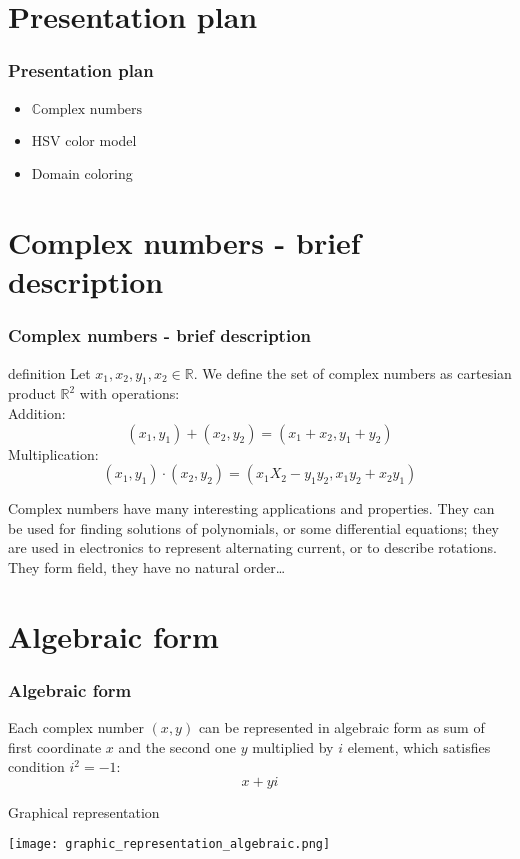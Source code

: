 \documentclass[11pt]{beamer}
\author{Alan Andrzejak, Aleksy Dziarmaga, Michał Kloc}
\title{}
\date{}
\begin{document}
\begin{frame}
\titlepage
\end{frame}
\section{Presentation plan}
\begin{frame}
\frametitle{Presentation plan}\pause
\begin{itemize}
\item $\mathbb{C}\mbox{omplex numbers}$
\pause
\item HSV color model
\pause
\item Domain coloring
\end{itemize}
\end{frame}
\section{Complex numbers - brief description}
\begin{frame}
\frametitle{Complex numbers - brief description}
\begin{block}{definition}\pause
Let $x_1, x_2, y_1, x_2\in\mathbb{R}$. We define the set of complex numbers as cartesian product $\mathbb{R}^2$ with operations:
\pause
\\
Addition:
$$(x_1,y_1)+(x_2,y_2)=(x_1+x_2,y_1+y_2)$$\pause
Multiplication:
$$(x_1,y_1)\cdot(x_2,y_2)=(x_1X_2-y_1y_2,x_1y_2+x_2y_1)$$
\end{block}
\pause
\begin{block}{}
Complex numbers have many interesting applications and properties. They can be used for finding solutions of polynomials, or some differential equations; they are used in electronics to represent alternating current, or to describe rotations. They form field, they have no natural order\dots
\end{block}
\end{frame}
\section{Algebraic form}
\begin{frame}
\frametitle{Algebraic form}
\begin{block}{}
Each complex number $(x,y)$ can be represented in algebraic form as sum of first coordinate $x$ and the second one $y$ multiplied by $i$ element, which satisfies condition $i^2=-1$:
\pause
$$x+yi$$
\end{block}
\pause
\begin{block}{Graphical representation}
\begin{center}
\texttt{[image: graphic\_representation\_algebraic.png]}
\end{center}
\end{block}
\end{frame}
\end{document}
